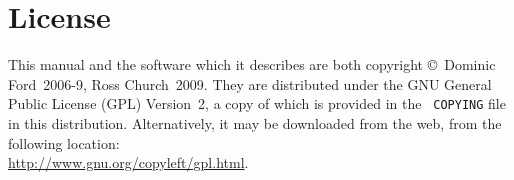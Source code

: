 
\section{License}

This manual and the software which it describes are both copyright \copyright\
Dominic Ford~2006-9, Ross Church~2009. They are distributed under the GNU
General Public License (GPL) Version~2, a copy of which is provided in the {\tt
COPYING} file in this distribution. Alternatively, it may be downloaded from the web, from
the following location:\\ \url{http://www.gnu.org/copyleft/gpl.html}.


